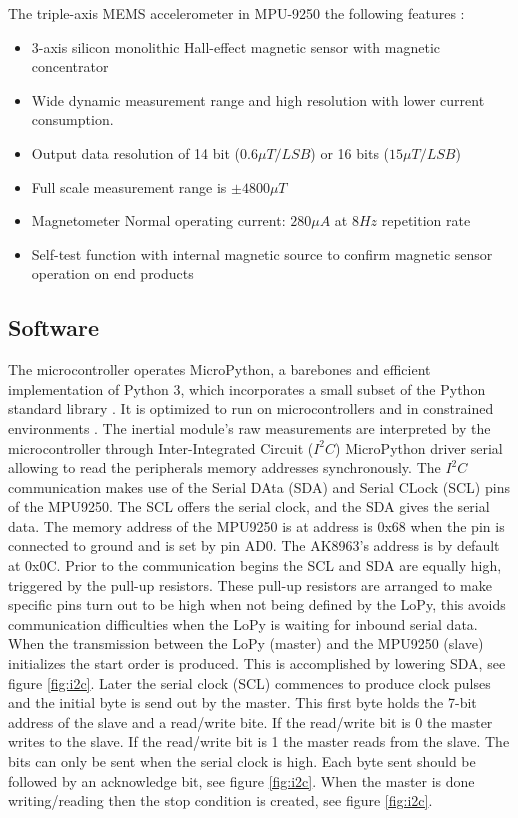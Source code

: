 The triple-axis MEMS accelerometer in MPU-9250 the following features \cite{mpu9250specification}:
\begin{itemize}
    \item 3-axis silicon monolithic Hall-effect magnetic sensor with magnetic concentrator
    \item Wide dynamic measurement range and high resolution with lower current consumption.
    \item Output data resolution of 14 bit ($0.6 \mu T/LSB$) or 16 bits ($15 \mu T/LSB$)
    \item Full scale measurement range is $\pm 4800 \mu T$
    \item Magnetometer Normal operating current: $280\mu A$ at $8 Hz$ repetition rate
    \item Self-test function with internal magnetic source to confirm magnetic sensor operation on end products
\end{itemize}



\subsection{Software}

The microcontroller operates MicroPython, a barebones and efficient implementation of Python 3, which incorporates a small subset of the Python standard library \cite{micropython}. It is optimized to run on microcontrollers and in constrained environments \cite{tollervey2017programming}. The inertial module's raw measurements are interpreted by the microcontroller through Inter-Integrated Circuit ($I^2C$) MicroPython driver serial allowing to read the peripherals memory addresses synchronously. The $I^2C$ communication makes use of the Serial DAta (SDA) and Serial CLock (SCL) pins of the MPU9250. The SCL offers the serial clock, and the SDA gives the serial data. The memory address of the MPU9250 is at address is 0x68 when the pin is connected to ground and is set by pin AD0. The AK8963's address is by default at 0x0C. Prior to the communication begins the SCL and SDA are equally high, triggered by the pull-up resistors. These pull-up resistors are arranged to make specific pins turn out to be high when not being defined by the LoPy, this avoids communication difficulties when the LoPy is waiting for inbound serial data.
When the transmission between the LoPy (master) and the MPU9250 (slave) initializes the start order is produced. This is accomplished by lowering SDA, see figure \ref{fig:i2c}. Later the serial clock (SCL) commences to produce clock pulses and the initial byte is send out by the master. This first byte holds the 7-bit address of the slave and a read/write bite. If the read/write bit is 0 the master writes to the slave. If the read/write bit is 1 the master reads from the slave. The bits can only be sent when the serial clock is high. Each byte sent should be followed by an acknowledge bit, see figure \ref{fig:i2c}. When the master is done writing/reading then the stop condition is created, see figure \ref{fig:i2c}.

